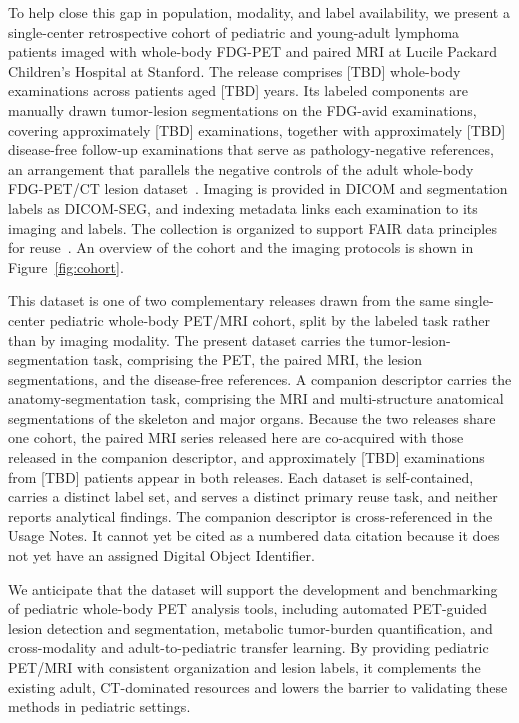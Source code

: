 To help close this gap in population, modality, and label availability, we present a single-center retrospective cohort of pediatric and young-adult lymphoma patients imaged with whole-body FDG-PET and paired MRI at Lucile Packard Children's Hospital at Stanford.
The release comprises [TBD] whole-body examinations across patients aged [TBD] years.
Its labeled components are manually drawn tumor-lesion segmentations on the FDG-avid examinations, covering approximately [TBD] examinations, together with approximately [TBD] disease-free follow-up examinations that serve as pathology-negative references, an arrangement that parallels the negative controls of the adult whole-body FDG-PET/CT lesion dataset~\cite{Gatidis_2022}.
Imaging is provided in DICOM and segmentation labels as DICOM-SEG, and indexing metadata links each examination to its imaging and labels.
The collection is organized to support FAIR data principles for reuse~\cite{Wilkinson_2016}.
An overview of the cohort and the imaging protocols is shown in Figure~\ref{fig:cohort}.

This dataset is one of two complementary releases drawn from the same single-center pediatric whole-body PET/MRI cohort, split by the labeled task rather than by imaging modality.
The present dataset carries the tumor-lesion-segmentation task, comprising the PET, the paired MRI, the lesion segmentations, and the disease-free references.
A companion descriptor carries the anatomy-segmentation task, comprising the MRI and multi-structure anatomical segmentations of the skeleton and major organs.
Because the two releases share one cohort, the paired MRI series released here are co-acquired with those released in the companion descriptor, and approximately [TBD] examinations from [TBD] patients appear in both releases.
Each dataset is self-contained, carries a distinct label set, and serves a distinct primary reuse task, and neither reports analytical findings.
The companion descriptor is cross-referenced in the Usage Notes.
It cannot yet be cited as a numbered data citation because it does not yet have an assigned Digital Object Identifier.

We anticipate that the dataset will support the development and benchmarking of pediatric whole-body PET analysis tools, including automated PET-guided lesion detection and segmentation, metabolic tumor-burden quantification, and cross-modality and adult-to-pediatric transfer learning.
By providing pediatric PET/MRI with consistent organization and lesion labels, it complements the existing adult, CT-dominated resources and lowers the barrier to validating these methods in pediatric settings.

